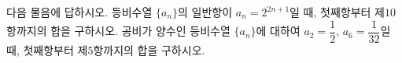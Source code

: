다음 물음에 답하시오.
 등비수열 $\{a_n\}$의 일반항이 $a_n=2^{2n+1}$일 때, 첫째항부터 제$10$항까지의 합을 구하시오.
 공비가 양수인 등비수열 $\{a_n\}$에 대하여 $a_2=\dfrac{1}{2}$, $a_6=\dfrac{1}{32}$일 때, 첫째항부터 제$5$항까지의 합을 구하시오.
